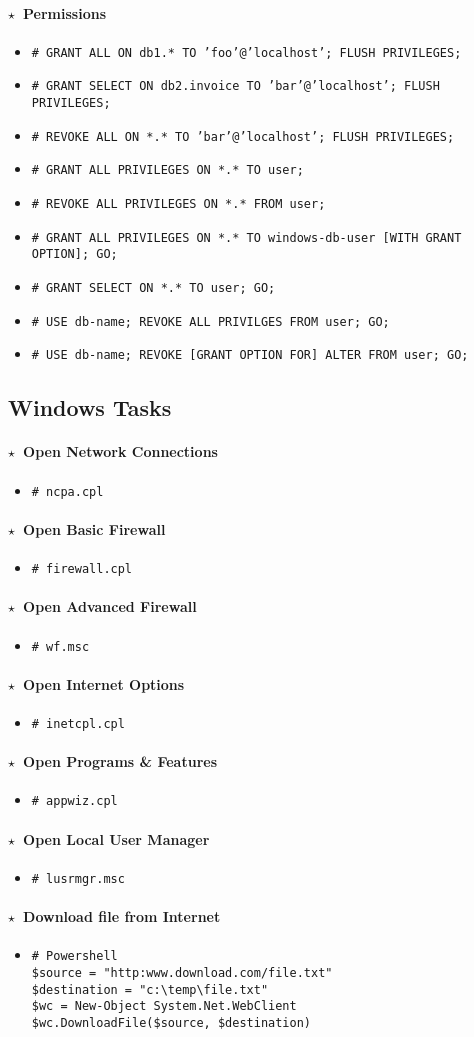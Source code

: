 \documentclass[10pt,landscape]{article}
\newcommand{\os}[1]{\texttt{\footnotesize{#1}}}
\newcommand{\windows}{\os{W}}
\newenvironment{action}[1]
  {\paragraph{$\star$~#1}\begin{itemize}[leftmargin=1cm]}
  {\end{itemize}}
\newcommand{\cmd}[2]{\item[#1] {\small\tt\# #2}}
\begin{document}
\begin{multicols*}{3}
\begin{action}{Permissions}
\cmd{\mysql}{GRANT ALL ON db1.* TO 'foo'@'localhost'; FLUSH PRIVILEGES;}
\cmd{\mysql}{GRANT SELECT ON db2.invoice TO 'bar'@'localhost'; FLUSH PRIVILEGES;}
\cmd{\mysql}{REVOKE ALL ON *.* TO 'bar'@'localhost'; FLUSH PRIVILEGES;}
\cmd{\postgres}{GRANT ALL PRIVILEGES ON *.* TO user;}
\cmd{\postgres}{REVOKE ALL PRIVILEGES ON *.* FROM user;}
\cmd{\mssql}{GRANT ALL PRIVILEGES ON *.* TO windows-db-user [WITH GRANT OPTION]; GO;}
\cmd{\mssql}{GRANT SELECT ON *.* TO user; GO;}
\cmd{\mssql}{USE db-name; REVOKE ALL PRIVILGES FROM user; GO;}
\cmd{\mssql}{USE db-name; REVOKE [GRANT OPTION FOR] ALTER FROM user; GO;}
\end{action}

\subsection*{Windows Tasks}

\begin{action}{Open Network Connections}
\cmd{\windows}{ncpa.cpl}
\end{action}

\begin{action}{Open Basic Firewall}
\cmd{\windows}{firewall.cpl}
\end{action}

\begin{action}{Open Advanced Firewall}
\cmd{\windows}{wf.msc}
\end{action}

\begin{action}{Open Internet Options}
\cmd{\windows}{inetcpl.cpl}
\end{action}

\begin{action}{Open Programs \& Features}
\cmd{\windows}{appwiz.cpl}
\end{action}

\begin{action}{Open Local User Manager}
\cmd{\windows}{lusrmgr.msc}
\end{action}

\begin{action}{Download file from Internet}
\cmd{\windows}{
Powershell \\
\$source = "http:www.download.com/file.txt" \\
\$destination = "c:\textbackslash temp\textbackslash file.txt" \\
\$wc = New-Object System.Net.WebClient \\
\$wc.DownloadFile(\$source, \$destination)}
\end{action}


\end{multicols*}
\end{document}
